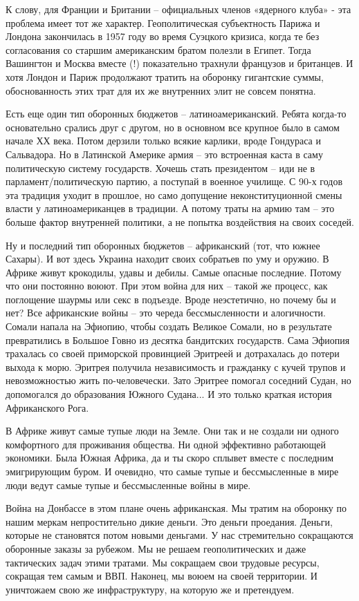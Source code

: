 К слову, для Франции и Британии – официальных членов «ядерного клуба» - эта
проблема имеет тот же характер. Геополитическая субъектность Парижа и Лондона
закончилась в 1957 году во время Суэцкого кризиса, когда те без согласования со
старшим американским братом полезли в Египет. Тогда Вашингтон и Москва вместе
(!) показательно трахнули французов и британцев. И хотя Лондон и Париж
продолжают тратить на оборонку гигантские суммы, обоснованность этих трат для
их же внутренних элит не совсем понятна.

Есть еще один тип оборонных бюджетов – латиноамериканский. Ребята когда-то
основательно срались друг с другом, но в основном все крупное было в самом
начале ХХ века. Потом дерзили только всякие карлики, вроде Гондураса и
Сальвадора. Но в Латинской Америке армия – это встроенная каста в саму
политическую систему государств. Хочешь стать президентом – иди не в
парламент/политическую партию, а поступай в военное училище. С 90-х годов эта
традиция уходит в прошлое, но само допущение неконституционной смены власти у
латиноамериканцев в традиции. А потому траты на армию там – это больше фактор
внутренней политики, а не попытка воздействия на своих соседей.

Ну и последний тип оборонных бюджетов – африканский (тот, что южнее Сахары). И
вот здесь Украина находит своих собратьев по уму и оружию. В Африке живут
крокодилы, удавы и дебилы. Самые опасные последние. Потому что они постоянно
воюют. При этом война для них – такой же процесс, как поглощение шаурмы или
секс в подъезде. Вроде неэстетично, но почему бы и нет? Все африканские войны –
это череда бессмысленности и алогичности. Сомали напала на Эфиопию, чтобы
создать Великое Сомали, но в результате превратились в Большое Говно из десятка
бандитских государств. Сама Эфиопия трахалась со своей приморской провинцией
Эритреей и дотрахалась до потери выхода к морю. Эритрея получила независимость
и гражданку с кучей трупов и невозможностью жить по-человечески. Зато Эритрее
помогал соседний Судан, но допомогался до образования Южного Судана... И это
только краткая история Африканского Рога.

В Африке живут самые тупые люди на Земле. Они так и не создали ни одного
комфортного для проживания общества. Ни одной эффективно работающей экономики.
Была Южная Африка, да и ты скоро сплывет вместе с последним эмигрирующим буром.
И очевидно, что самые тупые и бессмысленные в мире люди ведут самые тупые и
бессмысленные войны в мире.

Война на Донбассе в этом плане очень африканская. Мы тратим на оборонку по
нашим меркам непростительно дикие деньги. Это деньги проедания. Деньги, которые
не становятся потом новыми деньгами. У нас стремительно сокращаются оборонные
заказы за рубежом. Мы не решаем геополитических и даже тактических задач этими
тратами. Мы сокращаем свои трудовые ресурсы, сокращая тем самым и ВВП. Наконец,
мы воюем на своей территории. И уничтожаем свою же инфраструктуру, на которую
же и претендуем.

